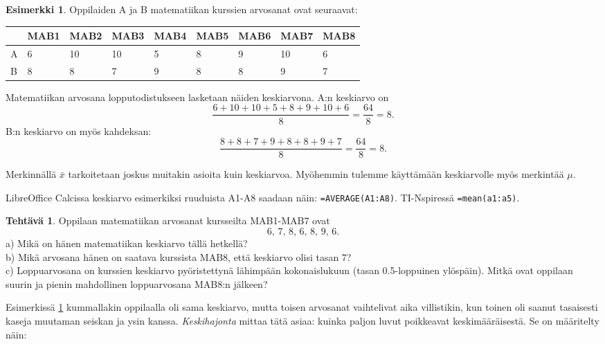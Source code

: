 \documentclass[12pt,leqno,a4paper,oneside]{amsart}
\theoremstyle{definition}
\newtheorem{example}[proclaim]{Esimerkki}
\newtheorem{exercise}{Tehtävä}
\theoremstyle{remark}
\numberwithin{equation}{section}
\begin{document}
\begin{example}
\label{samakeskiarvo}
Oppilaiden A ja B matematiikan kurssien arvosanat ovat seuraavat:

 \begin{tabular}{l|l|l|l|l|l|l|l|l}
  &MAB1 &MAB2 &MAB3 &MAB4 &MAB5 &MAB6 &MAB7 &MAB8\\
  \hline
  A &6 &10 &10 &5 &8 &9 &10 &6\\
  B &8 &8 &7 &9 &8 &8 &9 &7
 \end{tabular}

Matematiikan arvosana lopputodistukseen lasketaan näiden keskiarvona. A:n keskiarvo on
$$\frac{ 6 +10 +10 +5 +8 +9 +10 +6}{8} = \frac{64}{8} = 8.$$
B:n keskiarvo on myös kahdeksan:
$$\frac{8 +8 +7 +9 +8 +8 +9 +7}{8} = \frac{64}{8} = 8.$$
\end{example}

Merkinnällä $\bar{x}$ tarkoitetaan joskus muitakin asioita kuin keskiarvoa. Myöhemmin tulemme käyttämään keskiarvolle myös merkintää $\mu$.

LibreOffice Calcissa keskiarvo esimerkiksi ruuduista A1-A8 saadaan näin: \texttt{=AVERAGE(A1:A8)}.
TI-Nspiressä \texttt{=mean(a1:a5)}.

\begin{exercise}
 Oppilaan matematiikan arvosanat kursseilta MAB1-MAB7 ovat
 $$6,\, 7,\, 8,\, 6,\, 8,\, 9,\, 6.$$
 a) Mikä on hänen matematiikan keskiarvo tällä hetkellä?\\
 b) Mikä arvosana hänen on saatava kurssista MAB8, että keskiarvo olisi tasan 7?\\
 c) Loppuarvosana on kurssien keskiarvo pyöristettynä lähimpään kokonaislukuun (tasan 0.5-loppuinen ylöspäin).
 Mitkä ovat oppilaan suurin ja pienin mahdollinen loppuarvosana MAB8:n jälkeen?
\end{exercise}

Esimerkissä \ref{samakeskiarvo} kummallakin oppilaalla oli sama keskiarvo, mutta toisen arvosanat vaihtelivat aika villistikin, kun toinen oli saanut
tasaisesti kaseja muutaman seiskan ja ysin kanssa. \emph{Keskihajonta} mittaa tätä asiaa: kuinka paljon luvut poikkeavat keskimääräisestä.
Se on määritelty näin:

\begin{center}
\end{center}
\end{document}
